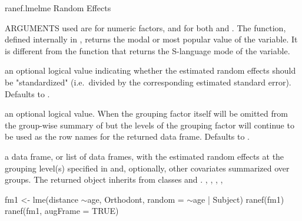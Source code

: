 \documentclass[pdftex]{article} \usepackage{url,graphicx}
\renewcommand{\Twiddle}{\mbox{\(\sim\)}}
\begin{document}
\begin{Helpfile}{ranef.lme}{lme Random Effects}
\begin{Argument}{ARGUMENTS}
used are  for numeric factors, and  for both
 and .  The  function, defined
internally in , returns the modal or most popular
value of the variable.  It is different from the  function
that returns the S-language mode of the variable.
\item[\Co{standard:}]
an optional logical value indicating whether the
estimated random effects should be "standardized" (i.e.\ divided by
the corresponding estimated standard error). Defaults to
.
\item[\Co{omitGroupingFactor:}]
an optional logical value.  When 
the grouping factor itself will be omitted from the group-wise
summary of  but the levels of the grouping factor will
continue to be used as the row names for the returned data frame.
Defaults to .
\end{Argument}
a data frame, or list of data frames, with the estimated 
random effects at the grouping level(s) specified in  and,
optionally, other covariates  summarized over groups. The returned
object inherits from classes  and
.
, ,
, ,
\need 15pt
\vspace{-16pt} 
\begin{Example}
fm1 <- lme(distance \Twiddle age, Orthodont, random = \Twiddle age | Subject)
ranef(fm1)
ranef(fm1, augFrame = TRUE)
\end{Example}
\end{Helpfile}
\end{document}
